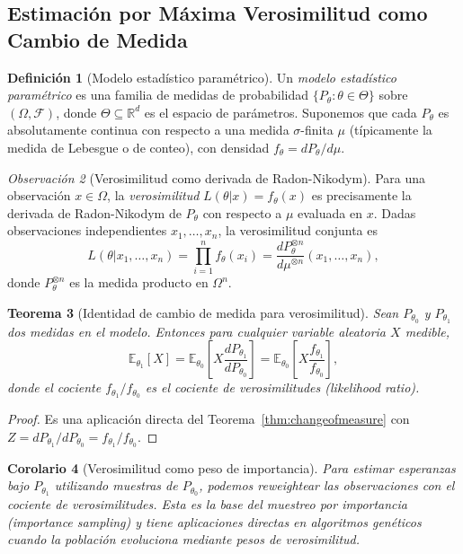 \documentclass[11pt,a4paper]{article}
\theoremstyle{plain}
\newtheorem{theorem}{Teorema}[section]
\newtheorem{corollary}[theorem]{Corolario}
\theoremstyle{definition}
\newtheorem{definition}[theorem]{Definición}
\theoremstyle{remark}
\newtheorem{remark}[theorem]{Observación}
\newcommand{\1}{\mathbf{1}}
\newcommand{\RR}{\mathbb{R}}
\newcommand{\cF}{\mathcal{F}}
\begin{document}
\subsection{Estimación por Máxima Verosimilitud como Cambio de Medida}

\begin{definition}[Modelo estadístico paramétrico]
Un \emph{modelo estadístico paramétrico} es una familia de medidas de probabilidad $\{P_\theta : \theta \in \Theta\}$ sobre $(\Omega,\cF)$, donde $\Theta \subseteq \RR^d$ es el espacio de parámetros. Suponemos que cada $P_\theta$ es absolutamente continua con respecto a una medida $\sigma$-finita $\mu$ (típicamente la medida de Lebesgue o de conteo), con densidad $f_\theta = dP_\theta/d\mu$.
\end{definition}

\begin{remark}[Verosimilitud como derivada de Radon-Nikodym]
Para una observación $x \in \Omega$, la \emph{verosimilitud} $L(\theta|x) = f_\theta(x)$ es precisamente la derivada de Radon-Nikodym de $P_\theta$ con respecto a $\mu$ evaluada en $x$. Dadas observaciones independientes $x_1,\ldots,x_n$, la verosimilitud conjunta es
\[
L(\theta|x_1,\ldots,x_n) = \prod_{i=1}^n f_\theta(x_i) = \frac{dP_\theta^{\otimes n}}{d\mu^{\otimes n}}(x_1,\ldots,x_n),
\]
donde $P_\theta^{\otimes n}$ es la medida producto en $\Omega^n$.
\end{remark}

\begin{theorem}[Identidad de cambio de medida para verosimilitud]
\label{thm:likelihood_change}
Sean $P_{\theta_0}$ y $P_{\theta_1}$ dos medidas en el modelo. Entonces para cualquier variable aleatoria $X$ medible,
\[
\mathbb{E}_{\theta_1}[X] = \mathbb{E}_{\theta_0}\left[X \frac{dP_{\theta_1}}{dP_{\theta_0}}\right] = \mathbb{E}_{\theta_0}\left[X \frac{f_{\theta_1}}{f_{\theta_0}}\right],
\]
donde el cociente $f_{\theta_1}/f_{\theta_0}$ es el \emph{cociente de verosimilitudes} (likelihood ratio).
\end{theorem}

\begin{proof}
Es una aplicación directa del Teorema~\ref{thm:changeofmeasure} con $Z = dP_{\theta_1}/dP_{\theta_0} = f_{\theta_1}/f_{\theta_0}$.
\end{proof}

\begin{corollary}[Verosimilitud como peso de importancia]
Para estimar esperanzas bajo $P_{\theta_1}$ utilizando muestras de $P_{\theta_0}$, podemos reweightear las observaciones con el cociente de verosimilitudes. Esta es la base del \emph{muestreo por importancia} (importance sampling) y tiene aplicaciones directas en algoritmos genéticos cuando la población evoluciona mediante pesos de verosimilitud.
\end{corollary}
\end{document}
